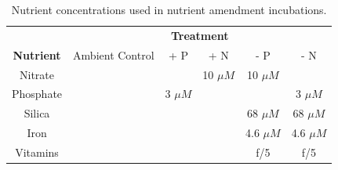 
\begin{table}[h!]
\centering
\caption[Nutrient concentrations used in nutrient amendment incubations. ]{Nutrient concentrations used in nutrient amendment incubations.}
\label{tab:a3t2}
\begin{tabular}{|c|c|c|c|c|c|}
\hline
                                    & \multicolumn{5}{c|}{\textbf{Treatment}}                                                                                              \\ \cline{2-6} 
\multirow{-2}{*}{\textbf{Nutrient}} & Ambient Control          & + P                      & + N                      & - P                      & - N                      \\ \hline
Nitrate                             & \cellcolor[HTML]{C0C0C0} & \cellcolor[HTML]{C0C0C0} & 10 $\mu M$                    & 10 $\mu M$                    & \cellcolor[HTML]{C0C0C0} \\ \hline
Phosphate                           & \cellcolor[HTML]{C0C0C0} & 3 $\mu M$                     & \cellcolor[HTML]{C0C0C0} & \cellcolor[HTML]{C0C0C0} & 3 $\mu M$                     \\ \hline
Silica                             & \cellcolor[HTML]{C0C0C0} & \cellcolor[HTML]{C0C0C0} & \cellcolor[HTML]{C0C0C0} & 68 $\mu M$                    & 68 $\mu M$                    \\ \hline
Iron                                & \cellcolor[HTML]{C0C0C0} & \cellcolor[HTML]{C0C0C0} & \cellcolor[HTML]{C0C0C0} & 4.6 $\mu M$                   & 4.6 $\mu M$                   \\ \hline
Vitamins                            & \cellcolor[HTML]{C0C0C0} & \cellcolor[HTML]{C0C0C0} & \cellcolor[HTML]{C0C0C0} & f/5                      & f/5                      \\ \hline
\end{tabular}
\end{table}



